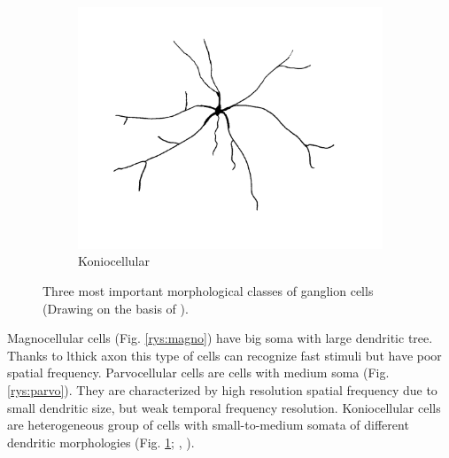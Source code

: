 \documentclass{pracalicmgr}
\begin{document}
\begin{figure}[H]
\begin{subfigure}{.33\textwidth}
	\includegraphics[width=1\linewidth]{cell_K2.png}
	\caption{Koniocellular}
	\label{rys:konio}
	\end{subfigure}
	\caption{Three most important morphological classes of ganglion cells  (Drawing on the basis of \cite{parallel}).}
	\label{rys:ganglio}
	\end{figure}
	 Magnocellular cells (Fig. \ref{rys:magno}) have big soma with large dendritic tree. Thanks to lthick axon this type of cells can recognize fast stimuli but have poor spatial frequency. Parvocellular cells are cells with medium soma (Fig. \ref{rys:parvo}). They are characterized by high resolution spatial frequency due to small dendritic size, but weak temporal frequency resolution. Koniocellular cells are heterogeneous group of cells with small-to-medium somata of different dendritic morphologies (Fig. \ref{rys:konio}; \cite{parallel}, \cite{viola}). 
	
	
\end{document}
